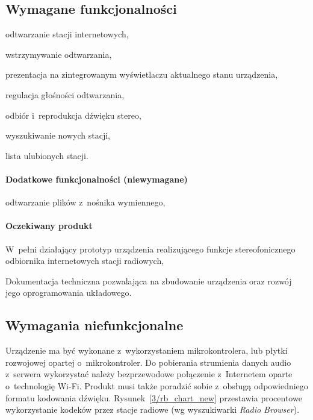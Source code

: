 \documentclass[polish]{aghengthesis}
\let\tempone\itemize
\let\temptwo\enditemize
\renewenvironment{itemize}{\tempone\setlength{\itemsep}{0cm}}{\temptwo}
\begin{document}
		
		\subsection{Wymagane funkcjonalności}
			\begin{itemize}
				\item odtwarzanie stacji internetowych,
				\item wstrzymywanie odtwarzania,
				\item prezentacja na zintegrowanym wyświetlaczu aktualnego stanu urządzenia,
				\item regulacja głośności odtwarzania,
				\item odbiór i~reprodukcja dźwięku stereo,
				\item wyszukiwanie nowych stacji,
				\item lista ulubionych stacji.
			\end{itemize}
			
			\paragraph{Dodatkowe funkcjonalności (niewymagane)}
			\begin{itemize}
				\item odtwarzanie plików z~nośnika wymiennego,
			\end{itemize}
		
			\paragraph{Oczekiwany produkt}
			\begin{itemize}
				\item W~pełni działający prototyp urządzenia realizującego funkcje stereofonicznego odbiornika internetowych stacji radiowych,
				\item Dokumentacja techniczna pozwalająca na zbudowanie urządzenia oraz rozwój jego oprogramowania układowego.
			\end{itemize}
		
		\subsection{Wymagania niefunkcjonalne}
			Urządzenie ma być wykonane z~wykorzystaniem mikrokontrolera, lub płytki rozwojowej opartej o~mikrokontroler.
			Do pobierania strumienia danych audio z~serwera wykorzystać należy  bezprzewodowe połączenie z~Internetem oparte o~technologię Wi-Fi.
			Produkt musi także poradzić sobie z~obsługą odpowiedniego formatu kodowania dźwięku.
			Rysunek~\ref{3/rb_chart_new} przestawia procentowe wykorzystanie kodeków przez stacje radiowe (wg wyszukiwarki \textit{Radio Browser}\textsuperscript{\cite{radio_browser_codecs}}).
			
\end{document}
